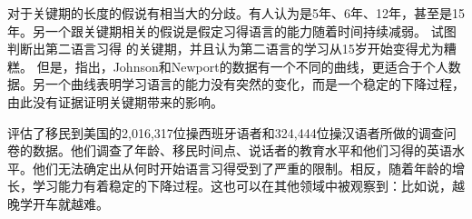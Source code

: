 \addlines
对于关键期的长度的假说有相当大的分歧。有人认为是5年、6年、12年，甚至是15年\citep[]{HBW2003a}。另一个跟关键期相关的假说是假定习得语言的能力随着时间持续减弱。
\citet{JN89a}试图判断出第二语言习得 的关键期，并且认为第二语言的学习从15岁开始变得尤为糟糕。\nocite{Sorace2003a}
但是，\citet*[\page]{EBJKSPP96a}指出，Johnson和Newport的数据有一个不同的曲线，更适合于个人数据。另一个曲线表明学习语言的能力没有突然的变化，而是一个稳定的下降过程，由此没有证据证明关键期带来的影响。

\citet*{HBW2003a}评估了移民到美国的2,016,317位操西班牙语者和324,444位操汉语者所做的调查问卷的数据。他们调查了年龄、移民时间点、说话者的教育水平和他们习得的英语水平。他们无法确定出从何时开始语言习得受到了严重的限制。相反，随着年龄的增长，学习能力有着稳定的下降过程。这也可以在其他领域中被观察到：比如说，越晚学开车就越难。

